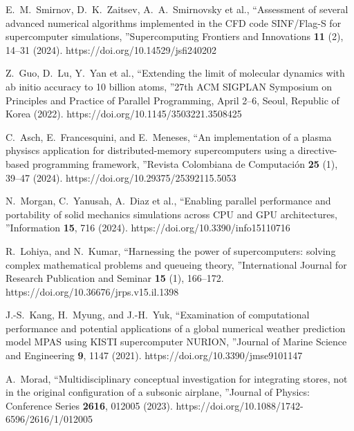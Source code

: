\documentclass[
11pt,%
tightenlines,%
twoside,%
onecolumn,%
nofloats,%
nobibnotes,%
nofootinbib,%
superscriptaddress,%
noshowpacs,%
centertags]%
{revtex4}
\begin{document}
\begin{thebibliography}{99}

E.~M.~Smirnov, D.~K.~Zaitsev, A.~A.~Smirnovsky et al., \textquotedblleft Assessment of several advanced numerical algorithms implemented in the CFD code SINF/Flag-S for supercomputer simulations, \textquotedblright Supercomputing Frontiers and Innovations \textbf{11} (2), 14--31 (2024). https://doi.org/10.14529/jsfi240202

Z.~Guo, D.~Lu, Y.~Yan et al., \textquotedblleft Extending the limit of molecular dynamics with ab initio accuracy to 10 billion atoms, \textquotedblright 27th ACM SIGPLAN Symposium on Principles and Practice of Parallel Programming, April 2--6, Seoul, Republic of Korea (2022). https://doi.org/10.1145/3503221.3508425

C.~Asch, E.~Francesquini, and E.~Meneses, \textquotedblleft An implementation of a plasma physiscs application for distributed-memory supercomputers using a directive-based programming framework, \textquotedblright Revista Colombiana de Computaci\'on \textbf{25} (1), 39--47 (2024). https://doi.org/10.29375/25392115.5053

N.~Morgan, C.~Yanusah, A.~Diaz et al., \textquotedblleft Enabling parallel performance and portability of solid mechanics simulations across CPU and GPU architectures, \textquotedblright Information \textbf{15}, 716 (2024). https://doi.org/10.3390/info15110716

R.~Lohiya, and N.~Kumar, \textquotedblleft Harnessing the power of supercomputers: solving complex mathematical problems and queueing theory, \textquotedblright International Journal for Research Publication and Seminar \textbf{15} (1), 166--172. https://doi.org/10.36676/jrps.v15.il.1398

J.-S.~Kang, H.~Myung, and J.-H.~Yuk, \textquotedblleft Examination of computational performance and potential applications of a global numerical weather prediction model MPAS using KISTI supercomputer NURION, \textquotedblright Journal of Marine Science and Engineering \textbf{9}, 1147 (2021). https://doi.org/10.3390/jmse9101147

A.~Morad, \textquotedblleft Multidisciplinary conceptual investigation for integrating stores, not in the original configuration of a subsonic airplane, \textquotedblright Journal of Physics: Conference Series \textbf{2616}, 012005 (2023). https://doi.org/10.1088/1742-6596/2616/1/012005


\end{thebibliography}
\end{document}
